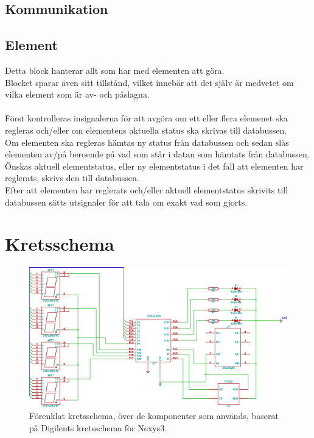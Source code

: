 \documentclass[a4paper]{scrartcl}
\begin{document}
	
	\subsection{Kommunikation}

	\subsection{Element}
		Detta block hanterar allt som har med elementen att göra.
		\\
		Blocket sparar även sitt tillstånd, vilket innebär att det själv är medvetet om vilka element som är av- och påslagna.
		\\\\
		Först kontrolleras insignalerna för att avgöra om ett eller flera elemenet ska regleras och/eller om elementens aktuella status ska
		skrivas till databussen.
		\\
		Om elementen ska regleras hämtas ny status från databussen och sedan slås elementen av/på beroende på vad som står i datan som hämtats
		från databussen.
		\\
		Önskas aktuell elementstatus, eller ny elementstatus i det fall att elementen har reglerats, skrivs den till databussen.
		\\
		Efter att elementen har reglerats och/eller aktuell elementstatus skrivits till databussen sätts utsignaler för att tala om exakt
		vad som gjorts.

		
		
\clearpage




	
\clearpage



\clearpage
\appendix
{}



\clearpage
\section{Kretsschema}
	\begin{figure}[H]
	\centering
	\includegraphics[width=0.88\textheight, angle=90]{kretsschema.eps}
	\caption{Förenklat kretsschema, över de komponenter som används, baserat på Digilents kretsschema för Nexys3.}
	\label{}
\end{figure}
\end{document}
